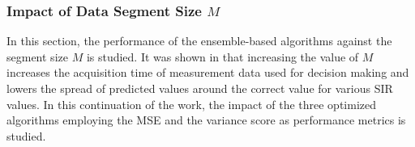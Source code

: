 

\subsubsection{Impact of Data Segment Size $M$}
In this section, the performance of the ensemble-based algorithms against the segment size $M$ is studied. It was shown in \cite{Candell_ISIT_2019} that increasing the value of $M$ increases the acquisition time of measurement data used for decision making and lowers the spread of predicted values around the correct value for various SIR values. In this continuation of the work, the impact of the three optimized algorithms employing the MSE and the variance score as performance metrics is studied.


